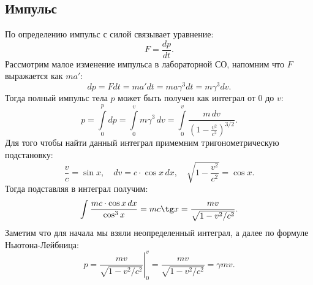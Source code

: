 \subsection{Импульс}
По определению импульс с силой связывает уравнение:
\begin{equation*}
	F = \frac{dp}{dt}.
\end{equation*}
Рассмотрим малое изменение импульса в лабораторной СО, напомним что $F$ выражается как $ma'$:
\begin{equation*}
	dp = F dt = m a' dt = m a \gamma^{3} dt = m \gamma^{3} dv.
\end{equation*}
Тогда полный импульс тела $p$ может быть получен как интеграл от 0 до $v$:
\begin{equation*}
	p = \int\limits_0^{p} dp = \int\limits_0^{v} m \gamma^{3} \,dv = \int\limits_0^{v} \frac{m \, dv}{\left(1 - \frac{v^2}{c^2}\right)^{3/2}}.
\end{equation*}
Для того чтобы найти данный интеграл примемним тригонометрическую подстановку:
\begin{equation}
	\frac{v}{c} = \sin x, \quad dv = c \cdot \cos x \, dx, \quad \sqrt{1-\frac{v^2}{c^2}} = \cos x.
	\label{eq:sr-imp-trigsub}
\end{equation}
Тогда подставляя в интеграл получим:
\begin{equation*}
	\int\limits \frac{mc \cdot \cos x \, dx}{\cos^{3} x} = mc \tg x = \frac{mv}{\sqrt{1-v^2/c^2}}.
\end{equation*}
Заметим что для начала мы взяли неопределенный интеграл, а далее по формуле Ньютона-Лейбница:
\begin{equation*}
	p=\left.\frac{m v}{\sqrt{1-v^2 / c^2}}\right|_0 ^v = \frac{mv}{\sqrt{1-v^2/c^2}} = \gamma m v.
\end{equation*}